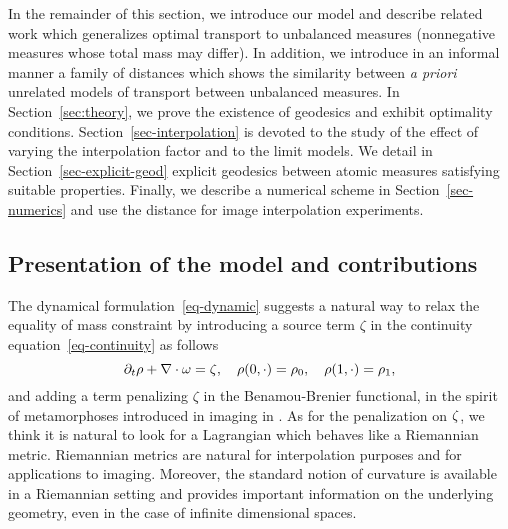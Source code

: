 In the remainder of this section, we introduce our model and describe related work which generalizes optimal transport to unbalanced measures (nonnegative measures whose total mass may differ). In addition, we introduce in an informal manner a family of distances which shows the similarity between \emph{a priori} unrelated models of transport between unbalanced measures. 
%
In Section~\ref{sec:theory}, we prove the existence of geodesics and exhibit optimality conditions. 
%
Section~\ref{sec-interpolation} is devoted to the study of the effect of varying the interpolation factor and to the limit models. 
%
We detail in Section~\ref{sec-explicit-geod} explicit geodesics between atomic measures satisfying suitable properties. 
%
Finally, we describe a numerical scheme in Section~\ref{sec-numerics} and use the distance for image interpolation experiments.





\subsection{Presentation of the model and contributions}

The dynamical formulation~\eqref{eq-dynamic} suggests a natural way to relax the equality of mass constraint by introducing a source term $\zeta$ in the continuity equation~\eqref{eq-continuity} as follows
\[
	\partial_t \rho + \nabla \cdot \omega = \zeta, \quad 
	\rho(0,\cdot) = \rho_0, \quad \rho(1,\cdot) = \rho_1, 
\]
and adding a term penalizing $\zeta$ in the Benamou-Brenier functional, in the spirit of metamorphoses introduced in imaging in \cite{Metamorphosis2005}. 
As for the penalization on $\zeta$, we think it is natural to look for a Lagrangian which behaves like a Riemannian metric. Riemannian metrics are natural for interpolation purposes and for applications to imaging. Moreover, the standard notion of curvature is available in a Riemannian setting and provides important information on the underlying geometry, even in the case of infinite dimensional spaces.

